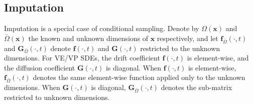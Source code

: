 \documentclass{article} %
\newcommand{\bfx}{\mathbf{x}}
\newcommand{\bff}{\mathbf{f}}
\newcommand{\bfG}{\mathbf{G}}
\newcommand{\bomega}{{\bar{\Omega}}}
\begin{document}
\subsection{Imputation} \label{app:imputation}
Imputation is a special case of conditional sampling. Denote by $\Omega(\bfx)$ and $\bomega(\bfx)$ the known and unknown dimensions of $\bfx$ respectively, and let $\bff_{\bomega}(\cdot, t)$ and $\bfG_{\bomega}(\cdot, t)$ denote $\bff(\cdot, t)$ and $\bfG(\cdot, t)$ restricted to the unknown dimensions. For VE/VP SDEs, the drift coefficient $\bff(\cdot, t)$ is element-wise, and the diffusion coefficient $\bfG(\cdot, t)$ is diagonal. When $\bff(\cdot, t)$ is element-wise, $\bff_{\bomega}(\cdot, t)$ denotes the same element-wise function applied only to the unknown dimensions. When $\bfG(\cdot, t)$ is diagonal, $\bfG_{\bomega}(\cdot, t)$ denotes the sub-matrix restricted to unknown dimensions. 
\end{document}
